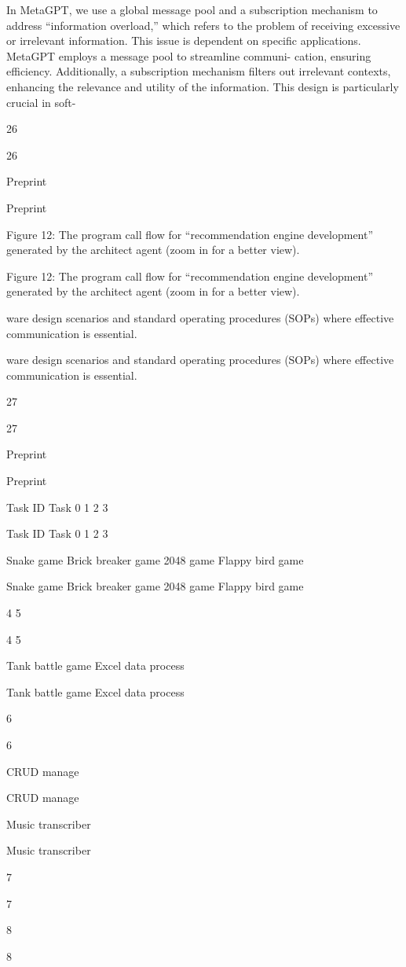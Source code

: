 \documentclass[12pt]{article}
\begin{document}
In MetaGPT, we use a global message pool and a subscription mechanism to address “information
overload,” which refers to the problem of receiving excessive or irrelevant information. This issue
is dependent on specific applications. MetaGPT employs a message pool to streamline communi-
cation, ensuring efficiency. Additionally, a subscription mechanism filters out irrelevant contexts,
enhancing the relevance and utility of the information. This design is particularly crucial in soft-


26


26


Preprint


Preprint


Figure 12: The program call flow for “recommendation engine development” generated by the
architect agent (zoom in for a better view).


Figure 12: The program call flow for “recommendation engine development” generated by the
architect agent (zoom in for a better view).


ware design scenarios and standard operating procedures (SOPs) where effective communication is
essential.


ware design scenarios and standard operating procedures (SOPs) where effective communication is
essential.


27


27


Preprint


Preprint


Task ID Task
0
1
2
3


Task ID Task
0
1
2
3


Snake game
Brick breaker game
2048 game
Flappy bird game


Snake game
Brick breaker game
2048 game
Flappy bird game


4
5


4
5


Tank battle game
Excel data process


Tank battle game
Excel data process


6


6


CRUD manage


CRUD manage


Music transcriber


Music transcriber


7


7


8


8
\end{document}
